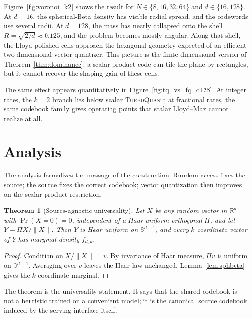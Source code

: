 \documentclass{article}
\newtheorem{theorem}{Theorem}
\theoremstyle{definition}
\theoremstyle{remark}
\newcommand{\bbR}{\mathbb{R}}
\newcommand{\bbS}{\mathbb{S}}
\begin{document}
Figure~\ref{fig:voronoi_k2} shows the result for
$N \in \{8, 16, 32, 64\}$ and $d \in \{16, 128\}$.  At $d = 16$, the
spherical-Beta density has visible radial spread, and the codewords
use several radii.  At $d = 128$, the mass has nearly collapsed
onto the shell $\bar R = \sqrt{2/d} \approx 0.125$, and the problem
becomes mostly angular.  Along that shell, the Lloyd-polished cells
approach the hexagonal geometry expected of an efficient
two-dimensional vector quantizer.  This picture is the
finite-dimensional version of Theorem~\ref{thm:dominance}: a scalar
product code can tile the plane by rectangles, but it cannot recover
the shaping gain of these cells.

The same effect appears quantitatively in
Figure~\ref{fig:tq_vs_fq_d128}.  At integer rates, the $k = 2$
branch lies below scalar \textsc{TurboQuant}; at fractional rates,
the same codebook family gives operating points that scalar
Lloyd--Max cannot realize at all.

\section{Analysis}
\label{sec:theory}

The analysis formalizes the message of the construction.  Random
access fixes the source; the source fixes the correct codebook;
vector quantization then improves on the scalar product restriction.

\begin{theorem}[Source-agnostic universality]
\label{thm:univ}
Let $X$ be any random vector in $\bbR^d$ with $\Pr(X = 0) = 0$,
independent of a Haar-uniform orthogonal $\Pi$, and let
$Y = \Pi X / \|X\|$.  Then $Y$ is Haar-uniform on $\bbS^{d - 1}$,
and every $k$-coordinate vector of $Y$ has marginal density
$f_{d, k}$.
\end{theorem}

\begin{proof}
Condition on $X / \|X\| = v$.  By invariance of Haar measure,
$\Pi v$ is uniform on $\bbS^{d - 1}$.  Averaging over $v$ leaves the
Haar law unchanged.  Lemma~\ref{lem:sphbeta} gives the
$k$-coordinate marginal.
\end{proof}

The theorem is the universality statement.  It says that the shared
codebook is not a heuristic trained on a convenient model; it is the
canonical source codebook induced by the serving interface itself.
\end{document}
